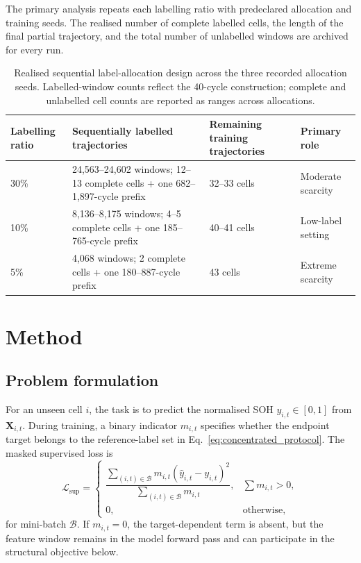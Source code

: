 \documentclass[pdflatex,sn-mathphys-num]{sn-jnl}
\begin{document}
The primary analysis repeats each labelling ratio with predeclared allocation and training seeds. The realised number of complete labelled cells, the length of the final partial trajectory, and the total number of unlabelled windows are archived for every run.

\begin{table}[t]
\caption{Realised sequential label-allocation design across the three recorded allocation seeds. Labelled-window counts reflect the 40-cycle construction; complete and unlabelled cell counts are reported as ranges across allocations.}
\label{tab:protocol_design}
\centering
\scriptsize
\setlength{\tabcolsep}{2pt}
\begin{tabular}{@{}p{}p{}p{}p{}@{}}
\toprule
Labelling ratio & Sequentially labelled trajectories & Remaining training trajectories & Primary role \\
\midrule
30\% & 24,563--24,602 windows; 12--13 complete cells + one 682--1,897-cycle prefix & 32--33 cells & Moderate scarcity \\
10\% & 8,136--8,175 windows; 4--5 complete cells + one 185--765-cycle prefix & 40--41 cells & Low-label setting \\
5\% & 4,068 windows; 2 complete cells + one 180--887-cycle prefix & 43 cells & Extreme scarcity \\
\bottomrule
\end{tabular}
\end{table}

\section{Method}
\label{sec:method}

\subsection{Problem formulation}
\label{subsec:problem}

For an unseen cell $i$, the task is to predict the normalised SOH $y_{i,t}\in[0,1]$ from $\mathbf{X}_{i,t}$. During training, a binary indicator $m_{i,t}$ specifies whether the endpoint target belongs to the reference-label set in Eq.~\eqref{eq:concentrated_protocol}. The masked supervised loss is
\begin{equation}
\mathcal{L}_{\mathrm{sup}}=
\begin{cases}
\dfrac{\sum_{(i,t)\in\mathcal{B}}m_{i,t}(\hat{y}_{i,t}-y_{i,t})^2}{\sum_{(i,t)\in\mathcal{B}}m_{i,t}}, & \sum m_{i,t}>0,\\[5pt]
0, & \text{otherwise},
\end{cases}
\label{eq:masked_mse}
\end{equation}
for mini-batch $\mathcal{B}$. If $m_{i,t}=0$, the target-dependent term is absent, but the feature window remains in the model forward pass and can participate in the structural objective below.
\end{document}
